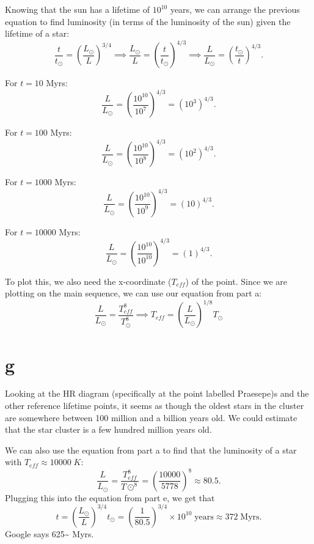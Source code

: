 \documentclass[11pt]{article}
\begin{document}
Knowing that the sun has a lifetime of \(10^{10}\) years, we can arrange
the previous equation to find luminosity (in terms of the luminosity of
the sun) given the lifetime of a star:
\[\frac{t}{t_\odot} = \left(\frac{L_\odot}{L}\right)^{3/4} \implies \frac{L_\odot}{L} = \left(\frac{t}{t_\odot}\right)^{4/3} \implies \frac{L}{L_\odot} = \left(\frac{t_\odot}{t}\right)^{4/3}.\]

For \(t = 10\) Myrs:
\[\frac{L}{L_\odot} = \left(\frac{10^{10}}{10^7}\right)^{4/3} = \left(10^3\right)^{4/3}.\]

For \(t = 100\) Myrs:
\[\frac{L}{L_\odot} = \left(\frac{10^{10}}{10^8}\right)^{4/3} = \left(10^2\right)^{4/3}.\]

For \(t = 1000\) Myrs:
\[\frac{L}{L_\odot} = \left(\frac{10^{10}}{10^9}\right)^{4/3} = \left(10\right)^{4/3}.\]

For \(t = 10000\) Myrs:
\[\frac{L}{L_\odot} = \left(\frac{10^{10}}{10^{10}}\right)^{4/3} = \left(1\right)^{4/3}.\]

To plot this, we also need the x-coordinate (\(T_{eff}\)) of the point.
Since we are plotting on the main sequence, we can use our equation from
part a:
\[\frac{L}{L_\odot} = \frac{T_{eff}^8}{T_\odot^8} \implies T_{eff} = \left(\frac{L}{L_\odot}\right)^{1/8}T_\odot\]

    \hypertarget{g}{%
\section*{g}\label{g}}

Looking at the HR diagram (specifically at the point labelled Praesepe)s
and the other reference lifetime points, it seems as though the oldest
stars in the cluster are somewhere between 100 million and a billion
years old. We could estimate that the star cluster is a few hundred
million years old.

We can also use the equation from part a to find that the luminosity of
a star with \(T_{eff} \approx 10000\;K\):
\[\frac{L}{L_\odot} = \frac{T_{eff}^8}{T\odot^8} = \left(\frac{10000}{5778}\right)^8 \approx 80.5.\]
Plugging this into the equation from part e, we get that
\[t = \left(\frac{L_\odot}{L}\right)^{3/4}t_\odot = \left(\frac{1}{80.5}\right)^{3/4} \times 10^{10}\;\text{years} \approx 372\;\text{Myrs}.\]
Google says 625\textasciitilde{} Myrs.


    
    
    
\end{document}
